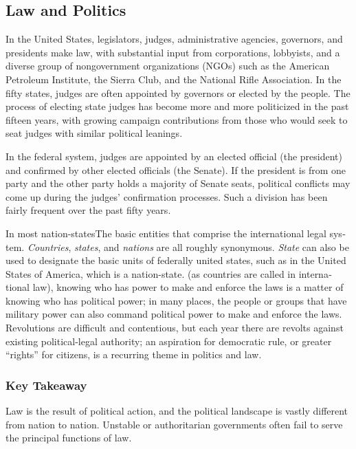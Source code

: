 \begin{english}
\hypertarget{mayer_1.0-ch01_s01_s02}{}
\subsection{Law and Politics}\label{law-and-politics}

In the United States, legislators, judges, administrative agencies,
governors, and presidents make law, with substantial input from
corporations, lobbyists, and a diverse group of nongovernment
organizations (NGOs) such as the American Petroleum Institute, the
Sierra Club, and the National Rifle Association. In the fifty states,
judges are often appointed by governors or elected by the people. The
process of electing state judges has become more and more politicized in
the past fifteen years, with growing campaign contributions from those
who would seek to seat judges with similar political leanings.

In the federal system, judges are appointed by an elected official (the
president) and confirmed by other elected officials (the Senate). If the
president is from one party and the other party holds a majority of
Senate seats, political conflicts may come up during the judges'
confirmation processes. Such a division has been fairly frequent over
the past fifty years.

In most nation-states{The basic entities that comprise the international
legal system. \emph{Countries}, \emph{states}, and \emph{nations} are
all roughly synonymous. \emph{State} can also be used to designate the
basic units of federally united states, such as in the United States of
America, which is a nation-state.} (as countries are called in
international law), knowing who has power to make and enforce the laws
is a matter of knowing who has political power; in many places, the
people or groups that have military power can also command political
power to make and enforce the laws. Revolutions are difficult and
contentious, but each year there are revolts against existing
political-legal authority; an aspiration for democratic rule, or greater
``rights'' for citizens, is a recurring theme in politics and law.

\hypertarget{mayer_1.0-ch01_s01_s02_n01}{}
\subsubsection{Key Takeaway}\label{key-takeaway}

Law is the result of political action, and the political landscape is
vastly different from nation to nation. Unstable or authoritarian
governments often fail to serve the principal functions of law.


\end{english}
